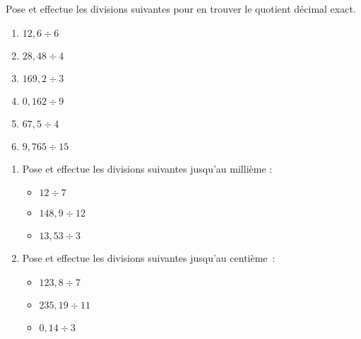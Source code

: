 \begin{exercice} 
Pose et effectue les divisions suivantes pour en trouver le quotient décimal exact.
\begin{enumerate} 
 \item $ 12,6 \div 6$ \dotfill \hspace*{11em}
 
 \item $ 28,48 \div 4$ \dotfill \hspace*{11em}

 \item $ 169,2 \div 3$ \dotfill \hspace*{11em}

 \item $ 0,162 \div 9$ \dotfill \hspace*{11em}

 \item $ 67,5 \div 4$ \dotfill \hspace*{11em}

 \item $ 9,765 \div 15$ \dotfill \hspace*{11em}
 
 \end{enumerate}
\end{exercice}


\begin{exercice} 
\begin{enumerate} 
 \item Pose et effectue les divisions suivantes jusqu'au millième :
 \begin{itemize}
  \item $12 \div 7$ \dotfill \hspace*{10em}
  
  \item $148,9 \div 12$ \dotfill \hspace*{10em}
  
  \item $13,53 \div 3$ \dotfill \hspace*{10em}
  
  \end{itemize}
 \item Pose et effectue les divisions suivantes jusqu'au centième :
  \begin{itemize}
  \item $123,8 \div 7$ \dotfill \hspace*{10em}
  
  \item $235,19 \div 11$ \dotfill \hspace*{10em}
  
  \item $0,14 \div 3$ \dotfill \hspace*{10em}
  
  \end{itemize}
 \end{enumerate}
\end{exercice}


